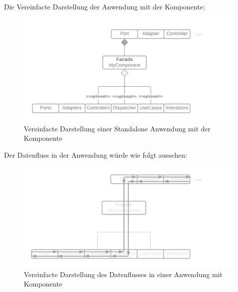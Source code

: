 \newpage
Die Vereinfacte Darstellung der Anwendung mit der Komponente:
\begin{figure}[H]
    \centering
    \includegraphics[width=1\textwidth]{./images/Architecture as Component.png}
    \caption{Vereinfacte Darstellung einer Standalone Anwendung mit der Komponente}
    \label{fig:SimpliedArchitectureAsStandaloneWithComponent}
\end{figure}

Der Datenfluss in der Anwendung würde wie folgt aussehen:
\begin{figure}[H]
    \centering
    \includegraphics[width=1\textwidth]{./images/Dataflow as Component with inform.png}
    \caption{Vereinfacte Darstellung des Datenflusses in einer Anwendung mit Komponente}
    \label{fig:SimpliedDataflowWithComponent}
\end{figure}